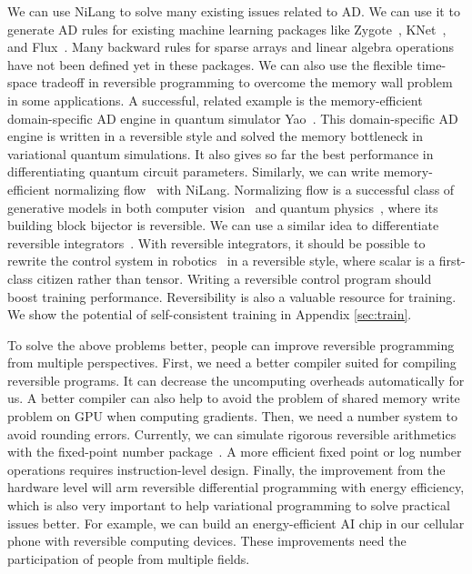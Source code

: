 \documentclass[aps,twocolumn,longbibliography,english,superscriptaddress]{revtex4-1}
\newcommand{\<}{\langle}
\renewcommand{\>}{\rangle}
\newcommand{\App}[1]{Appendix \ref{#1}}
\theoremstyle{definition}\newtheorem{definition}{\textit{Definition}}
\begin{document}
We can use NiLang to solve many existing issues related to AD.
We can use it to generate AD rules for existing machine learning packages like Zygote~\cite{Innes2019}, KNet~\cite{KNet}, and Flux~\cite{Innes2018a}.
Many backward rules for sparse arrays and linear algebra operations have not been defined yet in these packages.
We can also use the flexible time-space tradeoff in reversible programming to overcome the memory wall problem in some applications.
A successful, related example is the memory-efficient domain-specific AD engine in quantum simulator Yao~\cite{Luo2019}.
This domain-specific AD engine is written in a reversible style and solved the memory bottleneck in variational quantum simulations. It also gives so far the best performance in differentiating quantum circuit parameters.
Similarly, we can write memory-efficient normalizing flow~\cite{Kobyzev2019} with NiLang. Normalizing flow is a successful class of generative models in both computer vision~\cite{Kingma2018} and quantum physics~\cite{Dinh2016,Li2018}, where its building block bijector is reversible.
We can use a similar idea to differentiate reversible integrators~\cite{Hut1995, Laikov2018}.
With reversible integrators, it should be possible to rewrite the control system in robotics~\cite{Giftthaler2017} in a reversible style, where scalar is a first-class citizen rather than tensor.
Writing a reversible control program should boost training performance.
Reversibility is also a valuable resource for training.
We show the potential of self-consistent training in \App{sec:train}.

To solve the above problems better, people can improve reversible programming from multiple perspectives.
First, we need a better compiler suited for compiling reversible programs. It can decrease the uncomputing overheads automatically for us.
A better compiler can also help to avoid the problem of shared memory write problem on GPU when computing gradients.
Then, we need a number system to avoid rounding errors. Currently, we can simulate rigorous reversible arithmetics with the fixed-point number package~\cite{FixedPointNumbers,LogarithmicNumbers}. A more efficient fixed point or log number operations requires instruction-level design.
Finally, the improvement from the hardware level will arm reversible differential programming with energy efficiency, which is also very important to help variational programming to solve practical issues better. For example, we can build an energy-efficient AI chip in our cellular phone with reversible computing devices.
These improvements need the participation of people from multiple fields.
\end{document}
